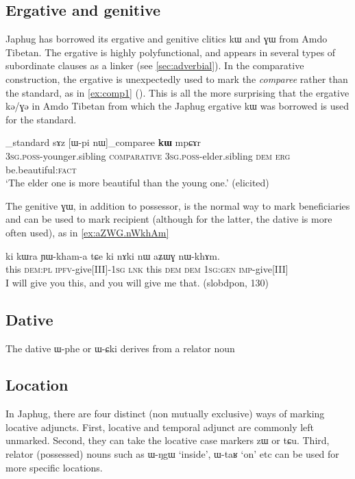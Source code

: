 \documentclass[oldfontcommands,oneside,a4paper,11pt]{article}
\newcommand{\ipa}[1]{{\phon #1}} %
\begin{document}
 

 
 \subsection{Ergative and genitive}  \label{sec:erg}
Japhug has borrowed its ergative  and genitive clitics \ipa{kɯ} and \ipa{ɣɯ} from Amdo Tibetan.  The ergative is highly polyfunctional,  and appears in several types of subordinate clauses as a linker (see \ref{sec:adverbial}). In the comparative construction, the ergative is unexpectedly used to mark the \textit{comparee} rather than the standard, as in \ref{ex:comp1} (\citealt{jacques15comparative}). This is all the more surprising that the ergative \ipa{kə/ɣə} in Amdo Tibetan from which the Japhug ergative \ipa{kɯ} was borrowed is used for the standard.

\begin{exe}
\ex \label{ex:comp1}
\gll  [\ipa{ɯ-ʁi}]_{standard}   	\ipa{sɤz}   	[\ipa{ɯ-pi}   	\ipa{nɯ}]_{comparee}   	\ipa{\textbf{kɯ}}   	\ipa{mpɕɤr}     \\
\textsc{3sg.poss}-younger.sibling \textsc{comparative} \textsc{3sg.poss}-elder.sibling \textsc{dem} \textsc{erg}  be.beautiful:\textsc{fact} \\
\glt `The elder one is more beautiful than the young one.' (elicited)
\end{exe}

The genitive \ipa{ɣɯ}, in addition to possessor, is the normal way to mark beneficiaries and can be used to mark recipient  (although for the latter, the dative is more often used), as in \ref{ex:aZWG.nWkhAm}
\begin{exe}
\ex \label{ex:aZWG.nWkhAm}
\gll
\ipa{ki} 	\ipa{kɯra} 	\ipa{ɲɯ-kham-a} 	\ipa{tɕe} 	\ipa{ki} 	\ipa{nɤki} 	\ipa{nɯ} 	\ipa{aʑɯɣ} 	\ipa{nɯ-khɤm.} \\
this \textsc{dem:pl} \textsc{ipfv}-give[III]-\textsc{1sg} \textsc{lnk} this \textsc{dem} \textsc{dem} \textsc{1sg:gen} \textsc{imp}-give[III] \\
\glt I will give you this, and you will give me that. (slobdpon, 130)
\end{exe}

 \subsection{Dative}  \label{sec:dat}
The dative \ipa{ɯ-phe} or \ipa{ɯ-ɕki} derives from a relator noun 
 \subsection{Location}   \label{sec:loc}
In Japhug, there are four distinct (non mutually exclusive) ways of marking locative adjuncts. First, locative and temporal adjunct are commonly left unmarked. Second, they can  take the locative case markers \ipa{zɯ} or \ipa{tɕu}. Third, relator (possessed) nouns such as \ipa{ɯ-ŋgɯ} `inside', \ipa{ɯ-taʁ} `on' etc can be used for more specific locations. 
\end{document}
